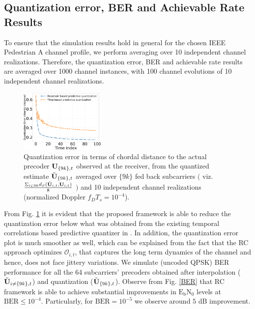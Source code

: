 \documentclass[conference]{IEEEtran}
\begin{document}
{\subsection{Quantization error, BER and Achievable Rate Results}
\label{res}{}
\noindent To ensure that the simulation results hold in general for the chosen IEEE Pedestrian A channel profile, we perform averaging over 10 independent channel realizations. Therefore, the quantization error, BER and achievable rate results are averaged over 1000 channel instances, with 100 channel evolutions of 10 independent channel realizations.
\begin{figure}
\centering
\includegraphics[width=0.37\textwidth]{images/qtizErr.pdf}
\caption{Quantization error in terms of chordal distance to the actual precoder ${\bf U}_{\{9k\},t}$ observed at the receiver, from the quantized estimate $\tilde{{\bf U}}_{\{9k\},t}$ averaged over $\{9k\}$ fed back subcarriers $\Big($ viz. $\frac{\Sigma_{i \in 9k}d_S(\tilde{{\bf U}}_{i,t}, {\bf U}_{i,t})}{8}$ $\Big)$ and 10 independent channel realizations (normalized Doppler $f_DT_s=10^{-4}$).}
\label{qtiz_err}
\end{figure}

From Fig. \ref{qtiz_err} it is evident that the proposed framework is able to reduce the quantization error below what was obtained from the existing temporal correlations based predictive quantizer in \cite{6891198}. In addition, the quantization error plot is much smoother as well, which can be explained from the fact that the RC approach optimizes $\mathcal{O}_{i,t}$, that captures the long term dynamics of the channel and hence, does not face jittery variations. We simulate (uncoded QPSK) BER performance for all the 64 subcarriers' precoders obtained after interpolation ($\tilde{{\bf U}}_{i\neq\{9k\},t}$) and quantization ($\tilde{{\bf U}}_{\{9k\},t}$). Observe from Fig. \ref{BER} that RC framework is able to achieve substantial improvements in $\text{E}_\text{b}\text{N}_0$ levels at $\text{BER}\leq 10^{-4}$. Particularly, for $\text{BER}=10^{-5}$ we observe around $5$ dB improvement.

}
\end{document}

